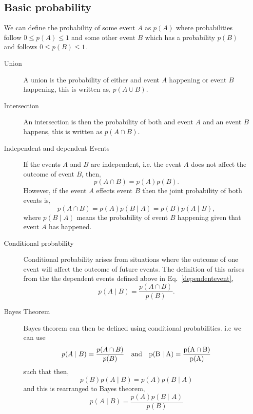 \subsection{\label{intro:prob:basic}Basic probability}

We can define the probability of some event $A$ as $p(A)$ where probabilities follow $0 \leq p(A) \leq 1$ and some other event $B$ which has a probability $p(B)$ and follows $0 \leq p(B) \leq 1$.

\begin{description}
\item [Union]
A union is the probability of either and event $A$ happening or event $B$ happening, this is written as, $p(A \cup B)$.

\item [Intersection]
An intersection is then the probability of both and event $A$ and an event $B$ happens, this is written as $p(A \cap B)$.

\item [Independent and dependent Events]
If the events $A$ and $B$ are independent, i.e. the event $A$ does not affect the outcome of event $B$, then,
\begin{equation}
p(A \cap B) = p(A)p(B).
\end{equation}
However, if the event $A$ effects event $B$ then the joint probability of both events is,
\begin{equation}
\label{dependentevent}
p(A \cap B) = p(A)p(B \mid A) = p(B)p(A \mid B),
\end{equation}
where $p(B \mid A)$ means the probability of event $B$ happening given that event $A$ has happened.

\item [Conditional probability]
Conditional probability arises from situations where the outcome of one event will affect the outcome of future events.
The definition of this arises from the the dependent events defined above in Eq.~\ref{dependentevent},
\begin{equation}
p(A \mid B) = \frac{p(A \cap B)}{p(B)}.
\end{equation}

\item [Bayes Theorem]
Bayes theorem can then be defined using conditional probabilities. i.e we can use
\begin{equation}
p(A \mid B) = \frac{p(A \cap B)}{p(B)} \quad \rm{and} \quad p(B \mid A) = \frac{p(A \cap B)}{p(A)}
\end{equation}
such that then,
\begin{equation}
p(B)p(A \mid B) = p(A)p(B \mid A)
\end{equation}
and this is rearranged to Bayes theorem,
\begin{equation}
p(A \mid B) = \frac{p(A)p(B \mid A)}{p(B)}
\end{equation}

\end{description}

